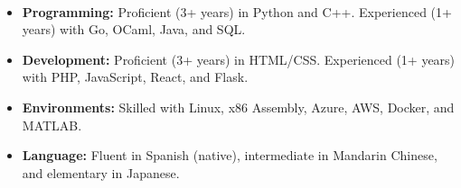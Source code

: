 \documentclass[11pt]{article}
\begin{document}
   \vspace{-7pt}\\
   \noindent\makebox[\linewidth]{\rule{7.5in}{0.3pt}}
   \begin{itemize}[itemsep=-.4em, leftmargin=1em]\vspace{-2mm} %
     \item \textbf{Programming:} Proficient (3+ years) in Python and C++. Experienced (1+ years) with Go, OCaml, Java, and SQL.
     \item \textbf{Development:} Proficient (3+ years) in HTML/CSS. Experienced (1+ years) with PHP, JavaScript, React, and Flask.
     \item \textbf{Environments:} Skilled with Linux, x86 Assembly, Azure, AWS, Docker, and MATLAB.
     \item \textbf{Language:} 
       Fluent in Spanish (native), intermediate in Mandarin Chinese, and elementary in Japanese.
   \end{itemize}
\end{document}
